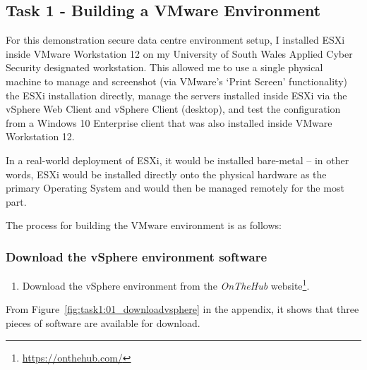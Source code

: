 \pagebreak
\subsection{Task 1 - Building a VMware Environment}
For this demonstration secure data centre environment setup, I installed ESXi inside VMware Workstation 12 on my University of South Wales Applied Cyber Security designated workstation. This allowed me to use a single physical machine to manage and screenshot (via VMware's `Print Screen' functionality) the ESXi installation directly, manage the servers installed inside ESXi via the vSphere Web Client and vSphere Client (desktop), and test the configuration from a Windows 10 Enterprise client that was also installed inside VMware Workstation 12.

In a real-world deployment of ESXi, it would be installed bare-metal -- in other words, ESXi would be installed directly onto the physical hardware as the primary Operating System and would then be managed remotely for the most part.

\bigskip
\noindent The process for building the VMware environment is as follows:

\subsubsection*{Download the vSphere environment software}
\begin{enumerate}[series=task1methodology]
  \item Download the vSphere environment from the \textit{OnTheHub\textsuperscript{\textregistered}} website\footnote{\url{https://onthehub.com/}}.
\end{enumerate}

\noindent From Figure~\ref{fig:task1:01_downloadvsphere} in the  appendix, it shows that three pieces of software are available for download. 

